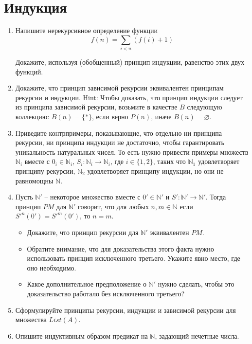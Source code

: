 \section*{Индукция}
\begin{enumerate}

\item Напишите нерекурсивное определение функции
\[ f(n) = \sum_{i < n} (f(i) + 1) \]

Докажите, используя (обобщенный) принцип индукции, равенство этих двух функций.


\item Докажите, что принцип зависимой рекурсии эквивалентен принципам рекурсии и индукции.
    Hint: Чтобы доказать, что принцип индукции следует из принципа зависимой рекурсии, возьмите 
    в качестве $B$ следующую коллекцию:
    $B(n) = \{ * \}$, если верно $P(n)$, иначе $B(n) = \varnothing$.

\item Приведите контрпримеры, показывающие, что отдельно ни принципа рекурсии, ни принципа 
индукции не достаточно, чтобы гарантировать уникальность натуральных чисел.
    То есть нужно привести примеры множеств $\mathbb{N}_i$ вместе с $0_i \in \mathbb{N}_i$, $S_i 
    : \mathbb{N}_i \to \mathbb{N}_i$, где $i \in \{ 1, 2 \}$,
    таких что $\mathbb{N}_1$ удовлетворяет принципу рекурсии, $\mathbb{N}_2$ удовлетворяет 
    принципу индукции, но они не равномощны $\mathbb{N}$.

\item Пусть $\mathbb{N}'$ -- некоторое множество вместе с $0' \in \mathbb{N}'$ и $S' : 
\mathbb{N}' \to \mathbb{N}'$.
    Тогда принцип $PM$ для $\mathbb{N}'$ говорит, что для любых $n,m \in \mathbb{N}$ если 
    $S'^n(0') = S'^m(0')$, то $n = m$.
\begin{itemize}
\item Докажите, что принцип рекурсии для $\mathbb{N}'$ эквивалентен $PM$.
\item Обратите внимание, что для доказательства этого факта нужно использовать принцип 
исключенного третьего. Укажите явно место, где оно необходимо.
\item Какое дополнительное предположение о $\mathbb{N}'$ нужно сделать, чтобы это доказательство 
работало без исключенного третьего?
\end{itemize}

\item Сформулируйте принципы рекурсии, индукции и зависимой рекурсии для множества $List(A)$.

\item Опишите индуктивным образом предикат на $\mathbb{N}$, задающий нечетные числа.

\end{enumerate}

